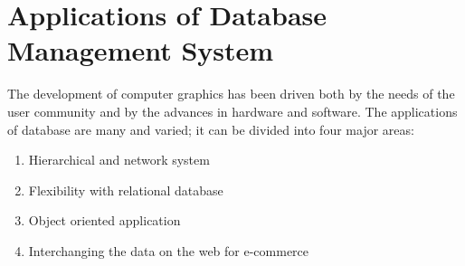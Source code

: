 \section{Applications of Database Management System}
The development of computer graphics has been driven both by the needs of
the user community and by the advances in hardware and software. The applications
of database are many and varied; it can be divided into four major areas:
\begin{enumerate}
\item Hierarchical and network system
\item Flexibility with relational database
\item Object oriented application
\item Interchanging the data on the web for e-commerce
\end{enumerate}
